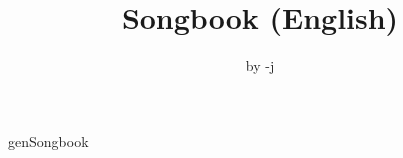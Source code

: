 \documentclass[11pt,a4paper,openany]{book}  %
\begin{document}
\Large

\title{Songbook (English)}
\author{by -j} 

\maketitle
\cleardoublepage
\tableofcontents
\newpage  %


genSongbook
\end{document}
